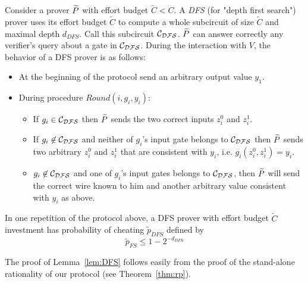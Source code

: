 Consider a prover $\widetilde{P}$ with effort budget $\tilde{C} < C$. A \emph{DFS} (for "depth first search") prover  uses its effort budget $\tilde{C}$ to compute a whole subcircuit of size $\tilde{C}$ and maximal depth $d_{DFS}$. Call this subcircuit $\cal{C}_{DFS}$. $\widetilde{P}$ can answer correctly any verifier's query about a gate in $\cal{C}_{DFS}$. During the interaction with $V$, the behavior of a DFS prover is as follows:
\begin{itemize}
\item At the beginning of the protocol send an arbitrary output value $y_1$.
\item During procedure $Round(i, g_i, y_i)$:
\begin{itemize}
\item If $g_i \in \cal{C}_{DFS}$  then $\widetilde{P}$ sends the two correct inputs $z^0_i$ and $z^1_i$.
\item If $g_i \not \in \cal{C}_{DFS}$ and neither of $g_i$'s input gate belongs to $\cal{C}_{DFS}$ then $\widetilde{P}$ sends two arbitrary $z^0_i$ and $z^1_i$ that are consistent with $y_i$, i.e. $g_i(z^0_i,z^1_i) = y_i$.
\item $g_i \not \in \cal{C}_{DFS}$ and one of $g_i$'s input gates belongs to $\cal{C}_{DFS}$, then $\widetilde{P}$ will send the correct wire known to him and another arbitrary value consistent with $y_i$ as above.
\end{itemize} 
\end{itemize}

\begin{lemma}
\label{lem:DFS}
In one repetition of the protocol above, a DFS prover with effort budget $\tilde{C}$ investment has probability of cheating $\tilde{p}_{DFS}$ defined by 
$$ \tilde{p}_{FS} \leq 1 - 2^{-d_{DFS}}$$
\end{lemma}

The proof of Lemma~\ref{lem:DFS} follows easily from the proof of the stand-alone rationality of our protocol (see Theorem~\ref{thm:rp}). 

